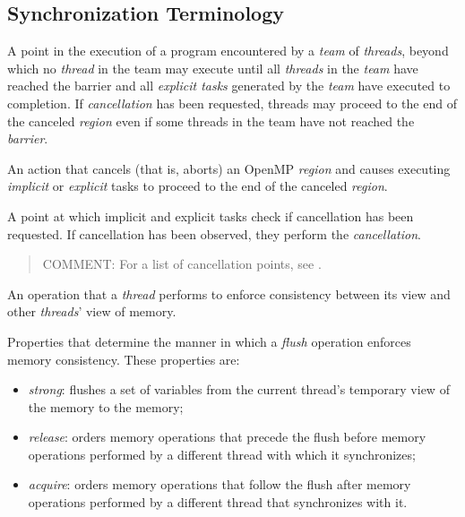 %
%
\subsection{Synchronization Terminology}
\label{subsec:Synchronization Terminology}
\glossarydefstart
A point in the execution of a program encountered by a \emph{team} 
of \emph{threads}, beyond which no \emph{thread} in the team may 
execute until all \emph{threads} in the \emph{team} have reached 
the barrier and all \emph{explicit tasks} generated by the \emph{team} 
have executed to completion. If \emph{cancellation} has been requested, 
threads may proceed to the end of the canceled \emph{region} even if 
some threads in the team have not reached the \emph{barrier}.
\glossarydefend

\glossarydefstart
An action that cancels (that is, aborts) an OpenMP \emph{region} and 
causes executing \emph{implicit} or \emph{explicit} tasks to proceed 
to the end of the canceled \emph{region}.
\glossarydefend

\glossarydefstart
A point at which implicit and explicit tasks check if cancellation has been
requested. If cancellation has been observed, they perform the \emph{cancellation}.

\begin{quote}
COMMENT: For a list of cancellation points, see .
\end{quote}
\glossarydefend
\bigskip

\glossarydefstart
An operation that a \emph{thread} performs to enforce consistency between its
view and other \emph{threads}' view of memory.
\glossarydefend

\glossarydefstart
Properties that determine the manner in which a \emph{flush} operation enforces
memory consistency. These properties are:
\begin{itemize}
    \item \emph{strong}: flushes a set of variables from the current thread's
        temporary view of the memory to the memory;
    \item \emph{release}: orders memory operations that precede the flush
        before memory operations performed by a different thread with which it
        synchronizes;
    \item \emph{acquire}: orders memory operations that follow the flush after
        memory operations performed by a different thread that synchronizes
        with it.
\end{itemize}

